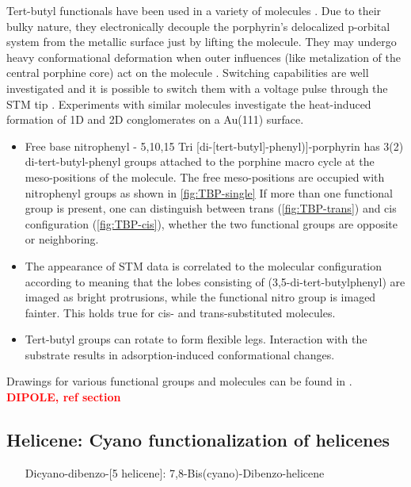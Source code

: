 Tert-butyl functionals have been used in a variety of molecules \cite{moresco_conformational_2001}. Due to their bulky nature, they electronically decouple the porphyrin’s delocalized p-orbital system from the metallic surface just by lifting the molecule. They may undergo heavy conformational deformation when outer influences (like metalization of the central porphine core) act on the molecule \cite{stark_massive_2014}. Switching capabilities are well investigated \cite{loppacher_direct_2003} and it is possible to switch them with a voltage pulse through the STM tip \cite{ditze_energetics_2014}. Experiments with similar molecules investigate the heat-induced formation of 1D and 2D conglomerates on a Au(111) surface.\cite{pham_heat-induced_2015}

\begin{itemize}
	\item Free base nitrophenyl - 5,10,15 Tri [di-[tert-butyl]-phenyl)]-porphyrin  has 3(2) di-tert-butyl-phenyl groups attached to the porphine macro cycle at the meso-positions of the molecule. The free meso-positions are occupied with nitrophenyl groups as shown in \autoref{fig:TBP-single} If more than one functional group is present, one can distinguish between trans (\autoref{fig:TBP-trans}) and cis configuration (\autoref{fig:TBP-cis}), whether the two functional groups are opposite or neighboring.
	\item The appearance of STM data is correlated to the molecular configuration according to \cite{mishra_current-driven_2015} meaning that the lobes consisting of (3,5-di-tert-butylphenyl) are imaged as bright protrusions, while the functional nitro group is imaged fainter. This holds true for cis- and trans-substituted molecules\cite{yokoyama_selective_2001}.
	\item Tert-butyl groups can rotate to form flexible legs. Interaction with the substrate results in adsorption-induced conformational changes.\cite{ecija_dynamics_2016}
\end{itemize}
Drawings for various functional groups and molecules can be found in \cite{jorgensen_salem_1973}.
\textcolor{red}{\textbf{DIPOLE, ref section}}
	\subsection{Helicene: Cyano functionalization of helicenes}
	\label{sec:helicene}
	\begin{itemize}
		\item[Dicyano-dibenzo-[5]helicene]: 7,8-Bis(cyano)-Dibenzo-helicene
	\end{itemize}
	
